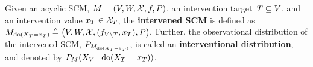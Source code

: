 \begin{definition}
Given an acyclic SCM, $M= {\left({V,W,\mathcal{X},f,P}\right)}$, an intervention target $\,T \subseteq V$, and an intervention value $x_T \in {\cal X}_{T}$, the \textbf{intervened SCM} is defined as $M_{\text{do}(X_T=x_T)} \triangleq {\left({V,W,\mathcal{X},(f_{V \backslash T},x_T),P}\right)}.$ Further, the observational distribution of the intervened SCM, $P_{M_{\text{do}(X_T=x_T)}}$, is called an \textbf{interventional distribution}, and denoted by $P_{M}{\left({X_V \mid \text{do}(X_T=x_T)}\right)}$.
\end{definition}




    

